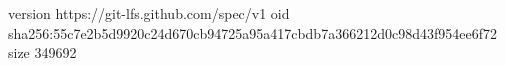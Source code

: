 version https://git-lfs.github.com/spec/v1
oid sha256:55c7e2b5d9920c24d670cb94725a95a417cbdb7a366212d0c98d43f954ee6f72
size 349692
